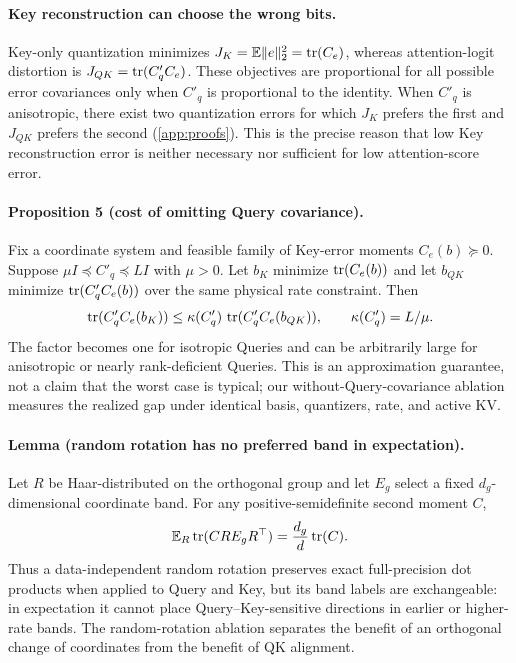 \paragraph{Key reconstruction can choose the wrong bits.}
Key-only quantization minimizes
$J_K=\mathbb E\|e\|_2^2=\operatorname{tr}(C_e)$, whereas attention-logit distortion is
$J_{QK}=\operatorname{tr}(C'_qC_e)$.
These objectives are proportional for all possible error covariances only
when $C'_q$ is proportional to the identity.
When $C'_q$ is anisotropic, there exist two quantization errors for which
$J_K$ prefers the first and $J_{QK}$ prefers the second
(\cref{app:proofs}).
This is the precise reason that low Key reconstruction error is neither
necessary nor sufficient for low attention-score error.

\paragraph{Proposition 5 (cost of omitting Query covariance).}
Fix a coordinate system and feasible family of Key-error moments
$C_e(b)\succeq0$.  Suppose
$\mu I\preceq C'_q\preceq LI$ with $\mu>0$.
Let $b_K$ minimize $\operatorname{tr}(C_e(b))$ and let $b_{QK}$ minimize
$\operatorname{tr}(C'_qC_e(b))$ over the same physical rate constraint.  Then
\begin{equation}
 \operatorname{tr}(C'_qC_e(b_K))
 \le \kappa(C'_q)\,
      \operatorname{tr}(C'_qC_e(b_{QK})),
 \qquad \kappa(C'_q)=L/\mu.
 \label{eq:key-only-condition-bound}
\end{equation}
The factor becomes one for isotropic Queries and can be arbitrarily large
for anisotropic or nearly rank-deficient Queries.  This is an approximation
guarantee, not a claim that the worst case is typical; our
without-Query-covariance ablation measures the realized gap under identical
basis, quantizers, rate, and active KV.

\paragraph{Lemma (random rotation has no preferred band in expectation).}
Let $R$ be Haar-distributed on the orthogonal group and let $E_g$ select a
fixed $d_g$-dimensional coordinate band.  For any positive-semidefinite
second moment $C$,
\begin{equation}
 \mathbb E_R\operatorname{tr}(CRE_gR^\top)=\frac{d_g}{d}\operatorname{tr}(C).
 \label{eq:random-band-exchangeability}
\end{equation}
Thus a data-independent random rotation preserves exact full-precision dot
products when applied to Query and Key, but its band labels are exchangeable:
in expectation it cannot place Query--Key-sensitive directions in earlier
or higher-rate bands.  The random-rotation ablation separates the benefit of
an orthogonal change of coordinates from the benefit of QK alignment.

